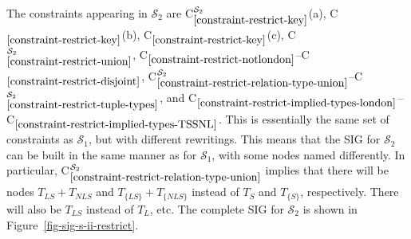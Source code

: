 \documentclass{article}
\newcounter{constraint}
\newcommand{\identifier}[1]{\ensuremath{\mathit{#1}}}
\newcommand{\LS}{\identifier{LS}}
\newcommand{\NLS}{\identifier{NLS}}
\newcommand{\LSsub}{\identifier{L}}
\newcommand{\Type}[1]{\ensuremath{T_{#1}}}
\newcommand{\TT}[1]{\ensuremath{T_{\{#1\}}}}
\newcommand{\TLSPlusNLS}{\ensuremath{\Type{\LS} + \Type{\NLS}}}
\newcommand{\TTLSPlusNLS}{\ensuremath{\TT{\LS} + \TT{\NLS}}}
\newcommand{\schema}[1]{\ensuremath{\mathcal{S}_{#1}}}
\newcommand{\Constraint}[2][]{C\ensuremath{_{#2}\ifx&#1&\else^{#1}\fi}}
\begin{document}
\noindent The constraints appearing in \(\schema{2}\) are \Constraint[\schema{2}]{\ref{constraint-restrict-key}}(a), \Constraint{\ref{constraint-restrict-key}}(b), \Constraint{\ref{constraint-restrict-key}}(c), \Constraint[\schema{2}]{\ref{constraint-restrict-union}}, \Constraint{\ref{constraint-restrict-notlondon}}--\Constraint{\ref{constraint-restrict-disjoint}}, \Constraint[\schema{2}]{\ref{constraint-restrict-relation-type-union}}--\Constraint[\schema{2}]{\ref{constraint-restrict-tuple-types}}, and \Constraint{\ref{constraint-restrict-implied-types-london}}--\Constraint{\ref{constraint-restrict-implied-types-TSSNL}}. This is essentially the same set of constraints as \(\schema{1}\), but with different rewritings. This means that the SIG for \(\schema{2}\) can be built in the same manner as for \(\schema{1}\), with some nodes named differently. In particular, \Constraint[\schema{2}]{\ref{constraint-restrict-relation-type-union}} implies that there will be nodes \(\TLSPlusNLS\) and \(\TTLSPlusNLS\) instead of \(\Type{S}\) and \(\TT{S}\), respectively. There will also be \(\Type{\LS}\) instead of \(\Type{\LSsub}\), etc. The complete SIG for \(\schema{2}\) is shown in Figure~\ref{fig-sig-s-ii-restrict}.

\end{document}
